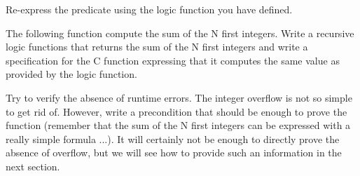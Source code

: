 


Re-express the  predicate using the logic function you
have defined.



\label{l4:acsl-properties-functions-n-first-ints}


The following function compute the sum of the N first integers. Write a
recursive logic functions that returns the sum of the N first integers and
write a specification for the C function expressing that it computes the same
value as provided by the logic function.




Try to verify the absence of runtime errors. The integer overflow is not so
simple to get rid of. However, write a precondition that should be enough to
prove the function (remember that the sum of the N first integers can be
expressed with a really simple formula ...). It will certainly not be enough
to directly prove the absence of overflow, but we will see how to provide such
an information in the next section.
